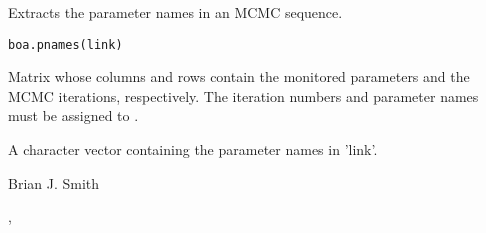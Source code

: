 \begin{Description}\relax
Extracts the parameter names in an MCMC sequence.
\end{Description}
\begin{Usage}
\begin{verbatim}
boa.pnames(link)
\end{verbatim}
\end{Usage}
\begin{Arguments}
\begin{ldescription}
\item[\code{link}] Matrix whose columns and rows contain the monitored parameters 
and the MCMC iterations, respectively. The iteration numbers and parameter 
names must be assigned to .
\end{ldescription}
\end{Arguments}
\begin{Value}
A character vector containing the parameter names in 'link'.
\end{Value}
\begin{Author}\relax
Brian J. Smith
\end{Author}
\begin{SeeAlso}\relax
{}, 
\end{SeeAlso}

